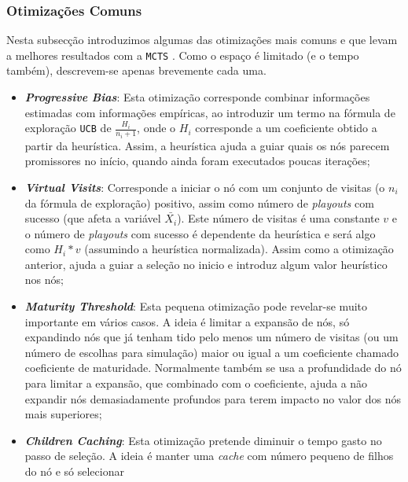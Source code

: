 \documentclass[12pt,a4paper,oneside]{article}
\begin{document}
\subsubsection{Otimizações Comuns}
\label{sec:mcopt}


Nesta subsecção introduzimos algumas das otimizações mais comuns e que
levam a melhores resultados com a \texttt{MCTS} \cite{Kozelek:2009}
\cite{Jakl:2011}. Como o espaço é limitado (e o tempo também),
descrevem-se apenas brevemente cada uma.

\begin{itemize}
\item \textbf{\textit{Progressive Bias}}: Esta otimização corresponde
  combinar informações estimadas com informações empíricas, ao
  introduzir um termo na fórmula de exploração \texttt{UCB} de
  $\frac{H_i}{n_i + 1}$, onde o $H_i$ corresponde a um coeficiente
  obtido a partir da heurística. Assim, a heurística ajuda a guiar
  quais os nós parecem promissores no início, quando ainda foram
  executados poucas iterações;
\item \textbf{\textit{Virtual Visits}}: Corresponde a iniciar o nó com
  um conjunto de visitas (o $n_i$ da fórmula de exploração) positivo,
  assim como número de \textit{playouts} com sucesso (que afeta a
  variável $\bar{X_i}$). Este número de visitas é uma constante $v$ e
  o número de \textit{playouts} com sucesso é dependente da heurística
  e será algo como $H_i * v$ (assumindo a heurística
  normalizada). Assim como a otimização anterior, ajuda a guiar a
  seleção no inicio e introduz algum valor heurístico nos nós;
\item \textbf{\textit{Maturity Threshold}}: Esta pequena otimização
  pode revelar-se muito importante em vários casos. A ideia é limitar
  a expansão de nós, só expandindo nós que já tenham tido pelo menos
  um número de visitas (ou um número de escolhas para simulação) maior
  ou igual a um coeficiente chamado coeficiente de
  maturidade. Normalmente também se usa a profundidade do nó para
  limitar a expansão, que combinado com o coeficiente, ajuda a não
  expandir nós demasiadamente profundos para terem impacto no valor
  dos nós mais superiores;
\item \textbf{\textit{Children Caching}}: Esta otimização pretende
  diminuir o tempo gasto no passo de seleção. A ideia é manter uma
  \textit{cache} com número pequeno de filhos do nó e só selecionar

\end{itemize}
\end{document}
